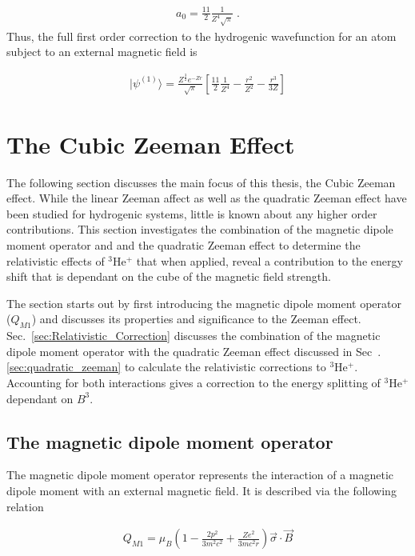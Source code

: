         \begin{align}
            a_0 = \frac{11}{2} \frac{1}{Z^4 \sqrt{\pi}}\;.
        \end{align}
        \noindent Thus, the full first order correction to the hydrogenic wavefunction for an atom subject to an external magnetic field is 

        \begin{align}
            \vert \psi^{(1)} \rangle = \frac{Z^{\frac{3}{2}} e^{-Zr}}{\sqrt{\pi}} \left[ \frac{11}{2} \frac{1}{Z^4} - \frac{r^2}{Z^2} - \frac{r^3}{3Z} \right]
        \end{align}


    \section{The Cubic Zeeman Effect}
        The following section discusses the main focus of this thesis, the Cubic Zeeman effect. While the linear Zeeman affect as well as the quadratic Zeeman effect have been studied for hydrogenic systems, little is known about any higher order contributions. This section investigates the combination of the magnetic dipole moment operator and and the quadratic Zeeman effect to determine the relativistic effects of $^3$He$^+$ that when applied, reveal a contribution to the energy shift that is dependant on the cube of the magnetic field strength.

        The section starts out by first introducing the magnetic dipole moment operator ($Q_{M1}$) and discusses its properties and significance to the Zeeman effect. Sec.~\ref{sec:Relativistic_Correction} discusses the combination of the magnetic dipole moment operator with the quadratic Zeeman effect discussed in Sec~.\ref{sec:quadratic_zeeman} to calculate the relativistic corrections to $^3$He$^+$. Accounting for both interactions gives a correction to the energy splitting of $^3$He$^+$ dependant on $B^3$.

        \subsection{The magnetic dipole moment operator}\label{sec:magnetic_dipole_operator}
            The magnetic dipole moment operator represents the interaction of a magnetic dipole moment with an external magnetic field. It is described via the following relation

            \begin{align}
                Q_{M1} = \mu_B \left( 1 - \frac{2p^2}{3m^2 c^2} + \frac{Ze^2}{3mc^2r} \right) \vec{\sigma} \cdot \vec{B}
            \end{align}

